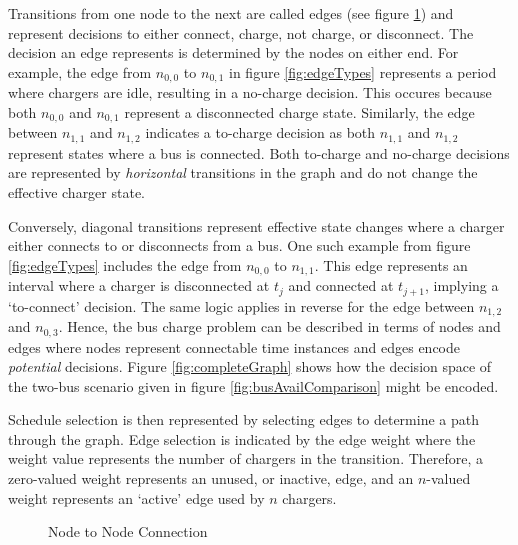 \par Transitions from one node to the next are called edges (see figure \ref{fig:edgeNodeRel}) and represent decisions to either connect, charge, not charge, or disconnect. The decision an edge represents is determined by the nodes on either end. For example, the edge from $n_{0,0}$ to $n_{0,1}$ in figure \ref{fig:edgeTypes} represents a period where chargers are idle, resulting in a no-charge decision. This occures because both $n_{0,0}$ and $n_{0,1}$ represent a disconnected charge state. Similarly, the edge between $n_{1,1}$ and $n_{1,2}$ indicates a to-charge decision as both $n_{1,1}$ and $n_{1,2}$ represent states where a bus is connected. Both to-charge and no-charge decisions are represented by \textit{horizontal} transitions in the graph and do not change the effective charger state. 
\par Conversely, diagonal transitions represent effective state changes where a charger either connects to or disconnects from a bus. One such example from figure \ref{fig:edgeTypes} includes the edge from $n_{0,0}$ to $n_{1,1}$. This edge represents an interval where a charger is disconnected at $t_j$ and connected at $t_{j+1}$, implying a `to-connect' decision. The same logic applies in reverse for the edge between $n_{1,2}$ and $n_{0,3}$. Hence, the bus charge problem can be described in terms of nodes and edges where nodes represent connectable time instances and edges encode \textit{potential} decisions. Figure \ref{fig:completeGraph} shows how the decision space of the two-bus scenario given in figure \ref{fig:busAvailComparison} might be encoded. 
\par Schedule selection is then represented by selecting edges to determine a path through the graph. Edge selection is indicated by the edge weight where the weight value represents the number of chargers in the transition. Therefore, a zero-valued weight represents an unused, or inactive, edge, and an $n$-valued weight represents an `active' edge used by $n$ chargers. 

\begin{figure}
	\centering
	\caption{Node to Node Connection}
	\label{fig:edgeNodeRel}
\end{figure}

